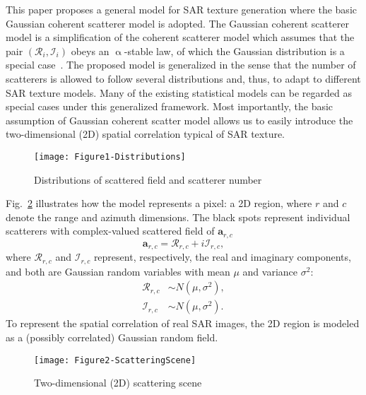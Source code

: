 \documentclass[journal]{IEEEtran}
\begin{document}
This paper proposes a general model for SAR texture generation where the basic Gaussian coherent scatterer model is adopted.
The Gaussian coherent scatterer model is a simplification
of the coherent scatterer model which assumes that the pair $(\mathcal{R}_{i} , \mathcal{I}_{i})$ obeys an
$\upalpha$-stable law, of which the Gaussian distribution is a special case~\cite{SimulationPropertiesStableLaw}.
The proposed model is generalized in the sense that the number of scatterers is allowed to follow several distributions and, thus, to adapt to different SAR texture models.
Many of the existing statistical models can be regarded as special cases under this generalized framework.
Most importantly, the basic assumption of Gaussian coherent scatter model allows us to easily introduce the two-dimensional (2D) spatial correlation typical of SAR texture.

\begin{figure}[hbt]
\centering
\texttt{[image: Figure1-Distributions]}
\caption{Distributions of scattered field and scatterer number}
\label{Figure1-Distributions}
\end{figure}

Fig.~\ref{Figure2-ScatteringScene} illustrates how the model represents a pixel: a 2D region, where $r$ and $c$ denote the range and azimuth dimensions.
The black spots represent individual scatterers with complex-valued scattered field of $\boldsymbol{a}_{r,c}$
\begin{equation}
\boldsymbol{a}_{r, c}=\mathcal{R}_{r, c}+i \mathcal{I}_{r, c} ,
\label{eq2:ScatteredField}
\end{equation}
where $\mathcal{R}_{r, c}$ and $\mathcal{I}_{r, c}$ represent, respectively, the real and imaginary components, and both are Gaussian random variables with mean $\mu$ and variance $\sigma^2$:
\begin{equation}
\begin{split}
\mathcal{R}_{r, c} & \sim N\left(\mu, \sigma^{2}\right), \\
\mathcal{I}_{r, c} & \sim N\left(\mu, \sigma^{2}\right).
\label{eq3:Gaussian}
\end{split}
\end{equation}
To represent the spatial correlation of real SAR images, the 2D region is modeled as a (possibly correlated) Gaussian random field.

\begin{figure}[hbt]
\centering
\texttt{[image: Figure2-ScatteringScene]}
\caption{Two-dimensional (2D) scattering scene}
\label{Figure2-ScatteringScene}
\end{figure}
\end{document}
